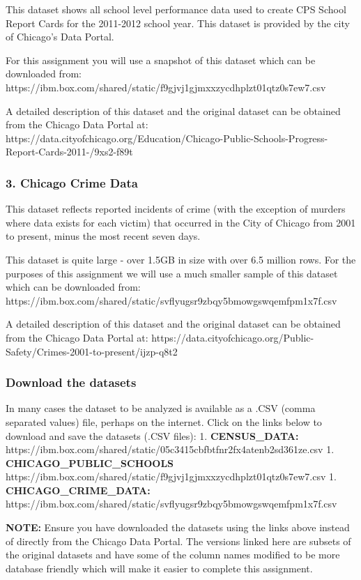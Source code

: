 \documentclass[11pt]{article}
\begin{document}
This dataset shows all school level performance data used to create CPS
School Report Cards for the 2011-2012 school year. This dataset is
provided by the city of Chicago's Data Portal.

For this assignment you will use a snapshot of this dataset which can be
downloaded from:
https://ibm.box.com/shared/static/f9gjvj1gjmxxzycdhplzt01qtz0s7ew7.csv

A detailed description of this dataset and the original dataset can be
obtained from the Chicago Data Portal at:
https://data.cityofchicago.org/Education/Chicago-Public-Schools-Progress-Report-Cards-2011-/9xs2-f89t

\subsubsection{3. Chicago Crime Data}\label{chicago-crime-data}

This dataset reflects reported incidents of crime (with the exception of
murders where data exists for each victim) that occurred in the City of
Chicago from 2001 to present, minus the most recent seven days.

This dataset is quite large - over 1.5GB in size with over 6.5 million
rows. For the purposes of this assignment we will use a much smaller
sample of this dataset which can be downloaded from:
https://ibm.box.com/shared/static/svflyugsr9zbqy5bmowgswqemfpm1x7f.csv

A detailed description of this dataset and the original dataset can be
obtained from the Chicago Data Portal at:
https://data.cityofchicago.org/Public-Safety/Crimes-2001-to-present/ijzp-q8t2

    \subsubsection{Download the datasets}\label{download-the-datasets}

In many cases the dataset to be analyzed is available as a .CSV (comma
separated values) file, perhaps on the internet. Click on the links
below to download and save the datasets (.CSV files): 1.
\textbf{CENSUS\_DATA:}
https://ibm.box.com/shared/static/05c3415cbfbtfnr2fx4atenb2sd361ze.csv
1. \textbf{CHICAGO\_PUBLIC\_SCHOOLS}
https://ibm.box.com/shared/static/f9gjvj1gjmxxzycdhplzt01qtz0s7ew7.csv
1. \textbf{CHICAGO\_CRIME\_DATA:}
https://ibm.box.com/shared/static/svflyugsr9zbqy5bmowgswqemfpm1x7f.csv

\textbf{NOTE:} Ensure you have downloaded the datasets using the links
above instead of directly from the Chicago Data Portal. The versions
linked here are subsets of the original datasets and have some of the
column names modified to be more database friendly which will make it
easier to complete this assignment.
\end{document}
